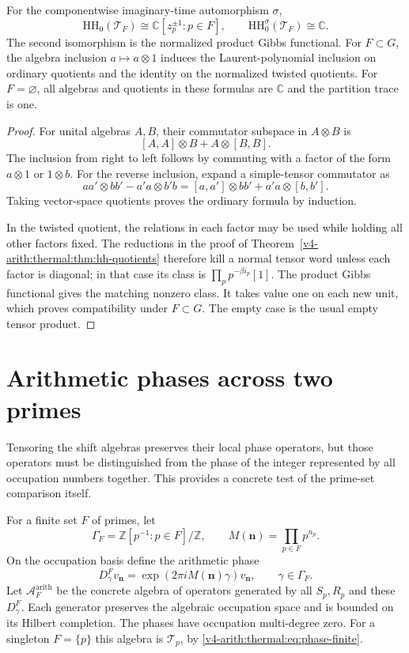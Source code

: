 \begin{proposition}
\label{v4-arith:thermal:prop:finite-prime}
For the componentwise imaginary-time automorphism $\sigma$,
\[
 \mathrm{HH}_0(\mathcal T_F)
     \cong\mathbb C[z_p^{\pm1}:p\in F],
 \qquad
 \mathrm{HH}_0^\sigma(\mathcal T_F)\cong\mathbb C.
\]
The second isomorphism is the normalized product Gibbs functional.
For $F\subset G$, the algebra inclusion
$a\mapsto a\otimes1$ induces the Laurent-polynomial inclusion
on ordinary quotients and the identity on the normalized twisted
quotients. For $F=\varnothing$, all algebras and quotients in
these formulas are $\mathbb C$ and the partition trace is one.
\end{proposition}

\begin{proof}
For unital algebras $A,B$, their commutator subspace in $A\otimes B$
is
\[
 [A,A]\otimes B+A\otimes[B,B].
\]
The inclusion from right to left follows by commuting with a factor
of the form $a\otimes1$ or $1\otimes b$. For the reverse inclusion,
expand a simple-tensor commutator as
\[
 aa'\otimes bb'-a'a\otimes b'b
   =[a,a']\otimes bb'+a'a\otimes[b,b'].
\]
Taking vector-space quotients proves the ordinary formula by
induction.

In the twisted quotient, the relations in each factor may be used
while holding all other factors fixed. The reductions in the proof
of Theorem~\ref{v4-arith:thermal:thm:hh-quotients} therefore kill a normal tensor
word unless each factor is diagonal; in that case its class is
$\prod_p p^{-\beta i_p}[1]$. The product Gibbs functional gives
the matching nonzero class. It takes value one on each new unit,
which proves compatibility under $F\subset G$. The empty case
is the usual empty tensor product.
\end{proof}

\section{Arithmetic phases across two primes}

Tensoring the shift algebras preserves their local phase operators,
but those operators must be distinguished from the phase of the
integer represented by all occupation numbers together. This
provides a concrete test of the prime-set comparison itself.

For a finite set $F$ of primes, let
\[
 \Gamma_F=\mathbb Z[p^{-1}:p\in F]/\mathbb Z,
 \qquad M(\mathbf n)=\prod_{p\in F}p^{n_p}.
\]
On the occupation basis define the arithmetic phase
\[
 D^{F}_\gamma v_{\mathbf n}
    =\exp(2\pi i M(\mathbf n)\gamma)v_{\mathbf n},
       \qquad \gamma\in\Gamma_F.
\]
Let $\mathcal A_F^{\mathrm{arith}}$ be the concrete algebra of
operators generated by all $S_p,R_p$ and these $D^F_\gamma$.
Each generator preserves the algebraic occupation space and is
bounded on its Hilbert completion. The phases have occupation
multi-degree zero. For a singleton $F=\{p\}$ this algebra is
$\mathcal T_p$, by \eqref{v4-arith:thermal:eq:phase-finite}.

